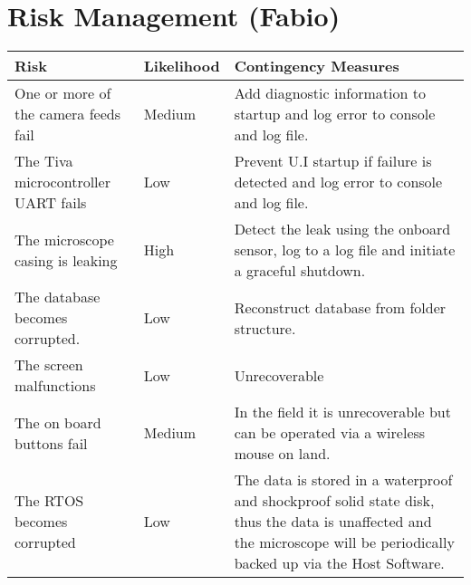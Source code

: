 \section{Risk Management (Fabio)}
\begin{longtable}{|m{}|m{}|m{}|}
	\hline
	\textbf{Risk}                                                  & \textbf{Likelihood} & \textbf{Contingency Measures}                                                                                                                                            \\ \hline
	One or more of the camera feeds fail                           & Medium              & Add diagnostic information to startup and log error to console and log file.                                                                                             \\ \hline
	The Tiva microcontroller UART fails                            & Low                 & Prevent U.I startup if failure is detected and log error to console and log file.                                                                                        \\ \hline
	The microscope casing is leaking                               & High                & Detect the leak using the onboard sensor, log to a log file and initiate a graceful shutdown.                                                                            \\ \hline
	The database becomes corrupted.                                & Low                 & Reconstruct database from folder structure.                                                                                                                              \\ \hline
	The screen malfunctions                                        & Low                 & Unrecoverable                                                                                                                                                            \\ \hline
	The on board buttons fail                                      & Medium              & In the field it is unrecoverable but can be operated via a wireless mouse on land.                                                                                       \\ \hline
	The RTOS becomes corrupted                                     & Low                 & The data is stored in a waterproof and shockproof solid state disk, thus the data is unaffected and the microscope will be periodically backed up via the Host Software. \\ \hline

\end{longtable}
